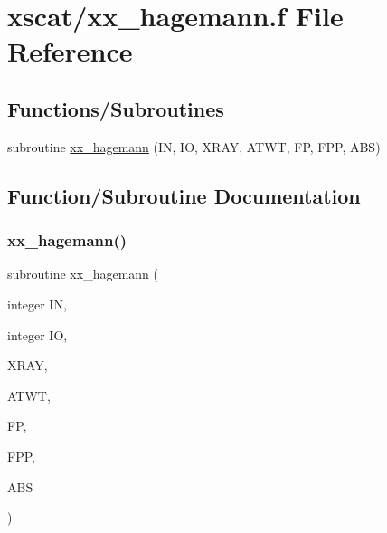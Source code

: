 \hypertarget{xx__hagemann_8f}{}\section{xscat/xx\+\_\+hagemann.f File Reference}
\label{xx__hagemann_8f}
\subsection*{Functions/\+Subroutines}
\begin{DoxyCompactItemize}
\item 
subroutine \hyperlink{xx__hagemann_8f_a2cd8527997d802ef0d7f5db7db3f0577}{xx\+\_\+hagemann} (IN, IO, X\+R\+AY, A\+T\+WT, FP, F\+PP, A\+BS)
\end{DoxyCompactItemize}


\subsection{Function/\+Subroutine Documentation}
\mbox{\label{xx__hagemann_8f_a2cd8527997d802ef0d7f5db7db3f0577}} 
\subsubsection{\texorpdfstring{xx\+\_\+hagemann()}{xx\_hagemann()}}
{\footnotesize\ttfamily subroutine xx\+\_\+hagemann (\begin{DoxyParamCaption}\item[{integer}]{IN,  }\item[{integer}]{IO,  }\item[{}]{X\+R\+AY,  }\item[{}]{A\+T\+WT,  }\item[{}]{FP,  }\item[{}]{F\+PP,  }\item[{}]{A\+BS }\end{DoxyParamCaption})}

